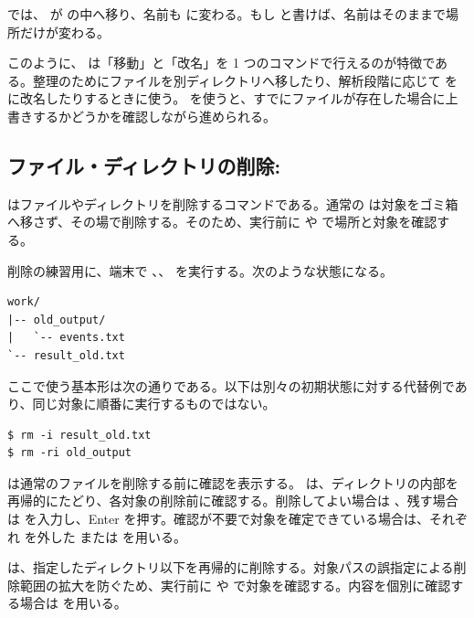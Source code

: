  では、 が  の中へ移り、名前も  に変わる。もし  と書けば、名前はそのままで場所だけが変わる。

このように、 は「移動」と「改名」を 1 つのコマンドで行えるのが特徴である。整理のためにファイルを別ディレクトリへ移したり、解析段階に応じて  を  に改名したりするときに使う。 を使うと、すでにファイルが存在した場合に上書きするかどうかを確認しながら進められる。

\subsection{ファイル・ディレクトリの削除: }

 はファイルやディレクトリを削除するコマンドである。通常の  は対象をゴミ箱へ移さず、その場で削除する。そのため、実行前に  や  で場所と対象を確認する。

削除の練習用に、端末で 、、 を実行する。次のような状態になる。

\begin{lstlisting}[numbers=none, xleftmargin=2\zw]
work/
|-- old_output/
|   `-- events.txt
`-- result_old.txt
\end{lstlisting}

ここで使う基本形は次の通りである。以下は別々の初期状態に対する代替例であり、同じ対象に順番に実行するものではない。

\begin{lstlisting}[numbers=none, xleftmargin=2\zw]
$ rm -i result_old.txt
$ rm -ri old_output
\end{lstlisting}

 は通常のファイルを削除する前に確認を表示する。 は、ディレクトリの内部を再帰的にたどり、各対象の削除前に確認する。削除してよい場合は 、残す場合は  を入力し、Enter を押す。確認が不要で対象を確定できている場合は、それぞれ  を外した  または  を用いる。

 は、指定したディレクトリ以下を再帰的に削除する。対象パスの誤指定による削除範囲の拡大を防ぐため、実行前に  や  で対象を確認する。内容を個別に確認する場合は  を用いる。

